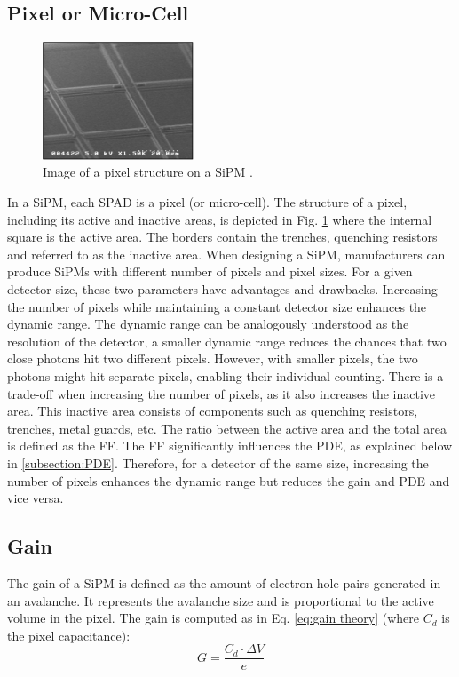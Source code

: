 \subsection{Pixel or Micro-Cell}
\label{subsec:Pixel or Micro-Cell}
\begin{figure}
    \centering
    \includegraphics[width=0.4\textwidth]{gfx/documentation/pixel_pic.png}
    \caption{Image of a pixel structure on a SiPM \cite{Onsemi2021IntroductionMultipliers}.}
    \label{fig:chapter02/sipm/pixel pic}
\end{figure}
In a SiPM, each SPAD is a pixel (or micro-cell). The structure of a pixel, including its active and inactive areas, is depicted in Fig. \ref{fig:chapter02/sipm/pixel pic} where the internal square is the active area. The borders contain the trenches, quenching resistors and referred to as the inactive area. When designing a SiPM, manufacturers can produce SiPMs with different number of pixels and pixel sizes. For a given detector size, these two parameters have advantages and drawbacks. 
Increasing the number of pixels while maintaining a constant detector size enhances the dynamic range. The dynamic range can be analogously understood as the resolution of the detector, a smaller dynamic range reduces the chances that two close photons hit two different pixels.
However, with smaller pixels, the two photons might hit separate pixels, enabling their individual counting.
There is a trade-off when increasing the number of pixels, as it also increases the inactive area. This inactive area consists of components such as quenching resistors, trenches, metal guards, etc. The ratio between the active area and the total area is defined as the \ac{FF}. The FF significantly influences the PDE, as explained below in \ref{subsection:PDE}.
Therefore, for a detector of the same size, increasing the number of pixels enhances the dynamic range but reduces the gain and PDE and vice versa.


\subsection{Gain}
\label{subsection:Gain}
The gain of a SiPM is defined as the amount of electron-hole pairs generated in an avalanche. It represents the avalanche size and is proportional to the active volume in the pixel.
The gain is computed as in Eq. \eqref{eq:gain theory} (where $C_d$ is the pixel capacitance): 
\begin{equation}
    G= \frac{C_d \cdot \Delta V}{e}
    \label{eq:gain theory}
\end{equation}


